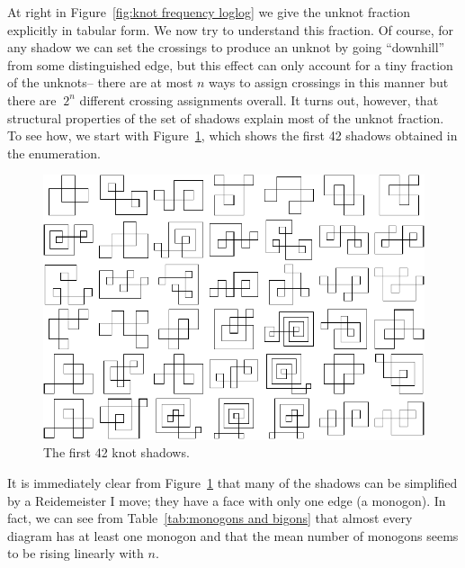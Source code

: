 \documentclass[amsmath,secnumarabic,floatfix,amssymb,nofootinbib,nobibnotes,letterpaper,11pt,tightenlines,showkeys]{revtex4}
\theoremstyle{definition}
\let\mgp=\marginpar \marginparwidth18mm \marginparsep1mm
\def\marginpar#1{\mgp{\raggedright\tiny #1}}
\let\lbl=\label
\def\label#1{\lbl{#1}\ifinner\else\marginpar{\ref{#1} #1}\ignorespaces\fi}
\begin{document}
At right in Figure~\ref{fig:knot frequency loglog} we give the unknot fraction explicitly in tabular form. We now try to understand this fraction. Of course, for any shadow we can set the crossings to produce an unknot by going ``downhill'' from some distinguished edge, but this effect can only account for a tiny fraction of the unknots-- there are at most $n$ ways to assign crossings in this manner but there are $~2^n$ different crossing assignments overall. It turns out, however, that structural properties of the set of shadows explain most of the unknot fraction. To see how, we start with Figure~\ref{fig:knot grid}, which shows the first 42 shadows obtained in the enumeration.
\begin{figure}
\includegraphics[width=6in]{knotgrid.pdf}
\caption{The first 42 knot shadows.}
\label{fig:knot grid}
\end{figure}
It is immediately clear from Figure~\ref{fig:knot grid} that many of the shadows can be simplified by a Reidemeister I move; they have a face with only one edge (a monogon). In fact, we can see from Table~\ref{tab:monogons and bigons} that almost every diagram has at least one monogon and that the mean number of monogons seems to be rising linearly with $n$.
\end{document}
